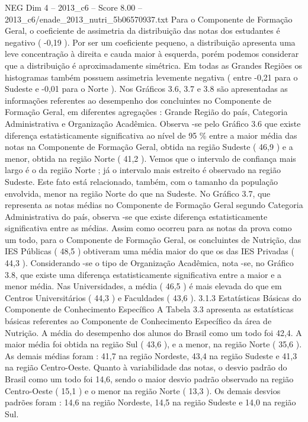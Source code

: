 \begin{textsample}{NEG Dim 4 – 2013\_c6 – Score 8.00 – 2013\_c6/enade\_2013\_nutri\_5b06570937.txt}
Para o Componente de Formação Geral, o coeficiente de assimetria da distribuição das notas dos estudantes é negativo ( -0,19 ).
Por ser um coeficiente pequeno, a distribuição apresenta uma leve concentração à direita e cauda maior à esquerda, porém podemos considerar que a distribuição é aproximadamente simétrica.
Em todas as Grandes Regiões os histogramas também possuem assimetria levemente negativa ( entre -0,21 para o Sudeste e -0,01 para o Norte ).
Nos Gráficos 3.6, 3.7 e 3.8 são apresentadas as informações referentes ao desempenho dos concluintes no Componente de Formação Geral, em diferentes agregações : Grande Região do país, Categoria Administrativa e Organização Acadêmica.
Observa -se pelo Gráfico 3.6 que existe diferença estatisticamente significativa ao nível de 95 \% entre a maior média das notas na Componente de Formação Geral, obtida na região Sudeste ( 46,9 ) e a menor, obtida na região Norte ( 41,2 ).
Vemos que o intervalo de confiança mais largo é o da região Norte ; já o intervalo mais estreito é observado na região Sudeste.
Este fato está relacionado, também, com o tamanho da população envolvida, menor na região Norte do que na Sudeste.
No Gráfico 3.7, que representa as notas médias no Componente de Formação Geral segundo Categoria Administrativa do país, observa -se que existe diferença estatisticamente significativa entre as médias.
Assim como ocorreu para as notas da prova como um todo, para o Componente de Formação Geral, os concluintes de Nutrição, das IES Públicas ( 48,5 ) obtiveram uma média maior do que os das IES Privadas ( 44,3 ).
Considerando -se o tipo de Organização Acadêmica, nota -se, no Gráfico 3.8, que existe uma diferença estatisticamente significativa entre a maior e a menor média.
Nas Universidades, a média ( 46,5 ) é mais elevada do que em Centros Universitários ( 44,3 ) e Faculdades ( 43,6 ). 3.1.3 Estatísticas Básicas do Componente de Conhecimento Específico A Tabela 3.3 apresenta as estatísticas básicas referentes ao Componente de Conhecimento Específico da área de Nutrição.
A média do desempenho dos alunos do Brasil como um todo foi 42,4.
A maior média foi obtida na região Sul ( 43,6 ), e a menor, na região Norte ( 35,6 ).
As demais médias foram : 41,7 na região Nordeste, 43,4 na região Sudeste e 41,3 na região Centro-Oeste.
Quanto à variabilidade das notas, o desvio padrão do Brasil como um todo foi 14,6, sendo o maior desvio padrão observado na região Centro-Oeste ( 15,1 ) e o menor na região Norte ( 13,3 ).
Os demais desvios padrões foram : 14,6 na região Nordeste, 14,5 na região Sudeste e 14,0 na região Sul.

\end{textsample}
